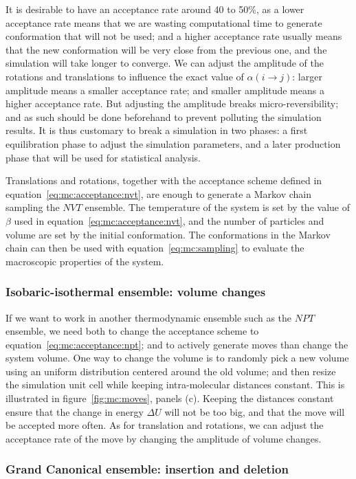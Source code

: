 \documentclass[thesis]{subfiles}
\begin{document}
It is desirable to have an acceptance rate around 40 to 50\%, as a lower
acceptance rate means that we are wasting computational time to generate
conformation that will not be used; and a higher acceptance rate usually means
that the new conformation will be very close from the previous one, and the
simulation will take longer to converge. We can adjust the amplitude of the
rotations and translations to influence the exact value of $\alpha(i \to j)$:
larger amplitude means a smaller acceptance rate; and smaller amplitude means a
higher acceptance rate. But adjusting the amplitude breaks micro-reversibility;
and as such should be done beforehand to prevent polluting the simulation
results. It is thus customary to break a simulation in two phases: a first
equilibration phase to adjust the simulation parameters, and a later production
phase that will be used for statistical analysis.

Translations and rotations, together with the acceptance scheme defined in
equation~\eqref{eq:mc:acceptance:nvt}, are enough to generate a Markov chain
sampling the $NVT$ ensemble. The temperature of the system is set by the value
of $\beta$ used in equation~\eqref{eq:mc:acceptance:nvt}, and the number of
particles and volume are set by the initial conformation. The conformations in
the Markov chain can then be used with equation~\eqref{eq:mc:sampling} to
evaluate the macroscopic properties of the system.

\subsubsection{Isobaric-isothermal ensemble: volume changes}

If we want to work in another thermodynamic ensemble such as the $NPT$ ensemble,
we need both to change the acceptance scheme to
equation~\eqref{eq:mc:acceptance:npt}; and to actively generate moves than
change the system volume. One way to change the volume is to randomly pick a new
volume using an uniform distribution centered around the old volume; and then
resize the simulation unit cell while keeping intra-molecular distances
constant. This is illustrated in figure~\ref{fig:mc:moves}, panels (c).  Keeping
the distances constant ensure that the change in energy $\Delta U$ will not be
too big, and that the move will be accepted more often.  As for translation and
rotations, we can adjust the acceptance rate of the move by changing the
amplitude of volume changes.

\subsubsection{Grand Canonical ensemble: insertion and deletion}
\end{document}
